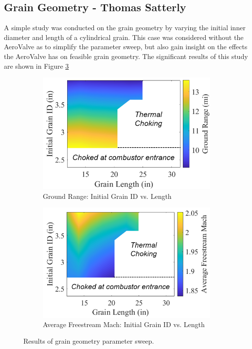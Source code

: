 
\subsection{Grain Geometry - Thomas Satterly}

A simple study was conducted on the grain geometry by varying the initial inner diameter and length of a cylindrical grain. This case was considered without the AeroValve as to simplify the parameter sweep, but also gain insight on the effects the AeroValve has on feasible grain geometry. The significant results of this study are shown in Figure \ref{fig:grainParamSweep}


\begin{figure}[H]
    \centering
    \begin{subfigure}[b]{0.45\textwidth}
        \includegraphics[width=\textwidth]{ParameterSweeps/figures/grainRange.png}
        \caption{Ground Range: Initial Grain ID vs. Length}
        \label{fig:grainParamSubRange}
    \end{subfigure}
    \hfill
    \begin{subfigure}[b]{0.45\textwidth}
        \centering
        \includegraphics[width=\textwidth]{ParameterSweeps/figures/grainMach.png}
        \caption{Average Freestream Mach: Initial Grain ID vs. Length}
        \label{fig:grainParamSubMach}
    \end{subfigure}
    \caption{Results of grain geometry parameter sweep.}
    \label{fig:grainParamSweep}
\end{figure}

